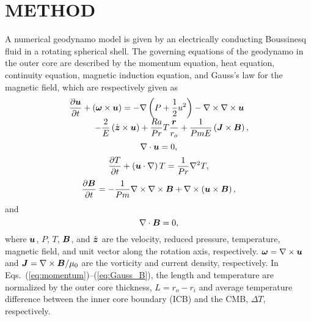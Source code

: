 \section{METHOD}

A numerical geodynamo model is given by an electrically conducting Boussinesq fluid in a rotating spherical shell. The governing equations of the geodynamo in the outer core are described by the momentum equation, heat equation, continuity equation, magnetic induction equation, and Gauss's law for the magnetic field, which are respectively given as
%
\begin{equation}
\begin{array}{l}
\displaystyle
\frac{\partial \mbox{\boldmath$u$}}{\partial t} + \left(\mbox{\boldmath$\omega$} \times \mbox{\boldmath$u$}\right)
 = - \nabla \left(P+\frac{1}{2}u^{2} \right) - \nabla \times \nabla \times \mbox{\boldmath$u$}
\\
\displaystyle
\hspace*{3em}
      - \frac{2}{E} \left(\hat{\mbox{\boldmath$z$}} \times \mbox{\boldmath$u$} \right)
  + \frac{Ra}{Pr} T \frac{\mbox{\boldmath$r$}}{r_{o}}
        + \frac{1}{Pm E} \left(\mbox{\boldmath$J$} \times \mbox{\boldmath$B$} \right),
\label{eq:momentum}
\end{array}
\end{equation}
%
\begin{equation}
\nabla \cdot \mbox{\boldmath$u$} = 0, 
\label{eq:conservation}
\end{equation}
%
\begin{equation}
\frac{\partial T}{\partial t} + \left(\mbox{\boldmath$u$} \cdot \nabla \right) T
 = \frac{1}{Pr} \nabla^{2} T,
\label{eq:heat}
\end{equation}
%
\begin{equation}
 \frac{\partial \mbox{\boldmath$B$}}{\partial t}
 = -\frac{1}{Pm}  \nabla \times \nabla \times \mbox{\boldmath$B$}
       + \nabla \times \left(\mbox{\boldmath$u$} \times \mbox{\boldmath$B$} \right),
\label{eq:induction}
\end{equation}
%
and
\begin{equation}
\nabla \cdot \mbox{\boldmath$B$} = 0,
\label{eq:Gauss_B}
\end{equation}
%
where $\mbox{\boldmath$u$}$, $P$, $T$, $\mbox{\boldmath$B$}$, and $\hat{\mbox{\boldmath$z$}}$ are the velocity, reduced pressure, temperature, magnetic field, and unit vector along the rotation axis, respectively. 
$\mbox{\boldmath$\omega$} = \nabla \times \mbox{\boldmath$u$}$ and $\mbox{\boldmath$J$} = \nabla \times \mbox{\boldmath$B$} / \mu_0$ are the vorticity and current density, respectively.
In Eqs.~(\ref{eq:momentum})--(\ref{eq:Gauss_B}), the length and temperature are normalized by the outer core thickness, $L = r_{o} - r_{i}$ and average temperature difference between the inner core boundary (ICB) and the CMB, $\Delta T$, respectively. 
